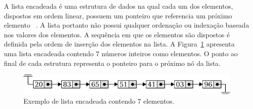 A lista encadeada é uma estrutura de dados na qual cada um dos elementos,
dispostos em ordem linear, possuem um ponteiro que referencia um próximo elemento
~\cite{cormen2009introduction}.
A lista portanto não possui qualquer ordenação ou indexação baseada nos valores dos
elementos.
A sequência em que os elementos são dispostos é definida pela ordem de inserção
dos elementos na lista.
A Figura~\ref{fig:lst-model} apresenta uma lista encadeada contendo 7 números inteiros como elementos.
O ponto ao final de cada estrutura representa o ponteiro para o próximo nó da lista.

\begin{figure}[ht]
  \centering
  \includegraphics[scale=0.6]{img/kdt/lst-model}
  \caption{Exemplo de lista encadeada contendo 7 elementos.}
  \label{fig:lst-model}
\end{figure}





